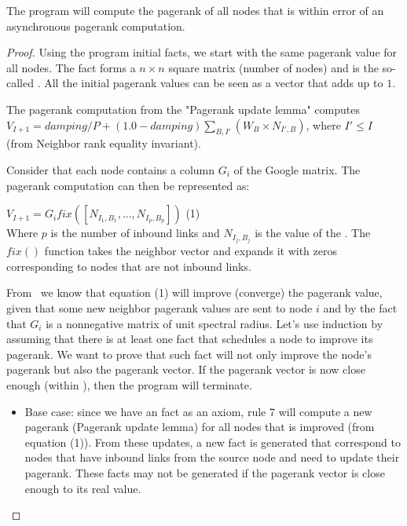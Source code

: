 \begin{theorem}
The program will compute the pagerank of all nodes that is within  error
of an asynchronous pagerank computation.
\end{theorem}
\begin{proof}

Using the program initial facts, we start with the same pagerank value for all
nodes.  The  fact forms a $n \times n$ square
matrix (number of nodes) and is the so-called .  All the
initial pagerank values can be seen as a vector that adds up to $1$.

The pagerank computation from the "Pagerank update lemma" computes $V_{I + 1} =
damping / P + (1.0 - damping)\sum_{B, I'} (W_{B} \times N_{I',B})$, where $I'
\leq I$ (from Neighbor rank equality invariant).

Consider that each node contains a column $G_i$ of the Google matrix. The
pagerank computation can then be represented as: \newline


$V_{I + 1} = G_i fix([N_{I_1, B_1}, ..., N_{I_p, B_p}])$ \hfill (1) \\


Where $p$ is the number of inbound links and $N_{I_j, B_j}$ is the value of
the . The $fix()$
function takes the neighbor vector and expands it with zeros corresponding to
nodes that are not inbound links.

From~\cite{DBLP:journals/corr/abs-cs-0606047, Lubachevsky:1986:CAA:4904.4801} we
know that equation (1) will improve (converge) the pagerank value, given that some new
neighbor pagerank values are sent to node $i$ and by the fact that $G_i$ is a
nonnegative matrix of unit spectral radius. Let's use induction by assuming that there
is at least one  fact that
schedules a node to improve its pagerank. We want to prove that such fact will
not only improve the node's pagerank but also the pagerank vector.
If the pagerank vector is now close enough (within ), then the
program will terminate.

\begin{itemize}

   \item Base case: since we have an  fact as an axiom, rule 7 will
      compute a new pagerank (Pagerank update lemma) for all nodes that is
      improved (from equation (1)). From these updates, a new  fact
      is generated that correspond to nodes that have inbound links from the
      source node and need to update their pagerank. These  facts
      may not be generated if the pagerank vector is close enough to its real
      value.


\end{itemize}
\end{proof}

